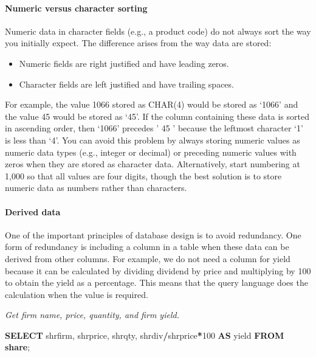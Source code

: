 \documentclass[
]{article}
\newenvironment{Shaded}{\begin{snugshade}}{\end{snugshade}}
\newcommand{\DecValTok}[1]{\textcolor[rgb]{0.00,0.00,0.81}{#1}}
\newcommand{\KeywordTok}[1]{\textcolor[rgb]{0.13,0.29,0.53}{\textbf{#1}}}
\newcommand{\NormalTok}[1]{#1}
\newcommand{\OperatorTok}[1]{\textcolor[rgb]{0.81,0.36,0.00}{\textbf{#1}}}
\begin{document}
\hypertarget{numeric-versus-character-sorting}{%
\paragraph*{Numeric versus character sorting}\label{numeric-versus-character-sorting}}

Numeric data in character fields (e.g., a product code) do not always sort the way you initially expect. The difference arises from the way data are stored:

\begin{itemize}
\item
  Numeric fields are right justified and have leading zeros.
\item
  Character fields are left justified and have trailing spaces.
\end{itemize}

For example, the value 1066 stored as CHAR(4) would be stored as `1066' and the value 45 would be stored as `45'. If the column containing these data is sorted in ascending order, then `1066' precedes ' 45 ' because the leftmost character `1' is less than `4'. You can avoid this problem by always storing numeric values as numeric data types (e.g., integer or decimal) or preceding numeric values with zeros when they are stored as character data. Alternatively, start numbering at 1,000 so that all values are four digits, though the best solution is to store numeric data as numbers rather than characters.

\hypertarget{derived-data}{%
\paragraph*{Derived data}\label{derived-data}}

One of the important principles of database design is to avoid redundancy. One form of redundancy is including a column in a table when these data can be derived from other columns. For example, we do not need a column for yield because it can be calculated by dividing dividend by price and multiplying by 100 to obtain the yield as a percentage. This means that the query language does the calculation when the value is required.

\emph{Get firm name, price, quantity, and firm yield.}

\begin{Shaded}
\begin{Highlighting}[]
\KeywordTok{SELECT}\NormalTok{ shrfirm, shrprice, shrqty, shrdiv}\OperatorTok{/}\NormalTok{shrprice}\OperatorTok{*}\DecValTok{100} \KeywordTok{AS}\NormalTok{ yield }\KeywordTok{FROM} \KeywordTok{share}\NormalTok{;}
\end{Highlighting}
\end{Shaded}
\end{document}
